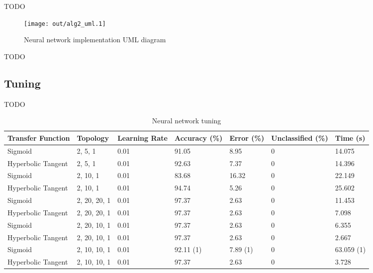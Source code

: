 \documentclass[a4paper]{article}
\begin{document}
TODO

\begin{figure}[h!]
  \centering
  \texttt{[image: out/alg2\_uml.1]}
  \caption{Neural network implementation UML diagram}
  \label{fig:nn_uml}
\end{figure}

TODO

\subsection{Tuning}
\label{sec:nn_tuning}

TODO

\begin{table}[h!]
  \centering
  \begin{tabular}{@{}lllllll@{}}
    \toprule
    Transfer Function  & Topology     & Learning Rate & Accuracy (\%) & Error (\%) & Unclassified (\%) & Time (s)   \\
    \midrule
    Sigmoid            & 2, 5, 1      & 0.01          & 91.05         & 8.95       & 0                 & 14.075     \\
    Hyperbolic Tangent & 2, 5, 1      & 0.01          & 92.63         & 7.37       & 0                 & 14.396     \\
    Sigmoid            & 2, 10, 1     & 0.01          & 83.68         & 16.32      & 0                 & 22.149     \\
    Hyperbolic Tangent & 2, 10, 1     & 0.01          & 94.74         & 5.26       & 0                 & 25.602     \\
    Sigmoid            & 2, 20, 20, 1 & 0.01          & 97.37         & 2.63       & 0                 & 11.453     \\
    Hyperbolic Tangent & 2, 20, 20, 1 & 0.01          & 97.37         & 2.63       & 0                 & 7.098      \\
    Sigmoid            & 2, 20, 10, 1 & 0.01          & 97.37         & 2.63       & 0                 & 6.355      \\
    Hyperbolic Tangent & 2, 20, 10, 1 & 0.01          & 97.37         & 2.63       & 0                 & 2.667      \\
    Sigmoid            & 2, 10, 10, 1 & 0.01          & 92.11 (1)     & 7.89 (1)   & 0                 & 63.059 (1) \\
    Hyperbolic Tangent & 2, 10, 10, 1 & 0.01          & 97.37         & 2.63       & 0                 & 3.728      \\
    \bottomrule
  \end{tabular}
  \caption{Neural network tuning}
  \label{tab:nn_tuning}
\end{table}
\end{document}
